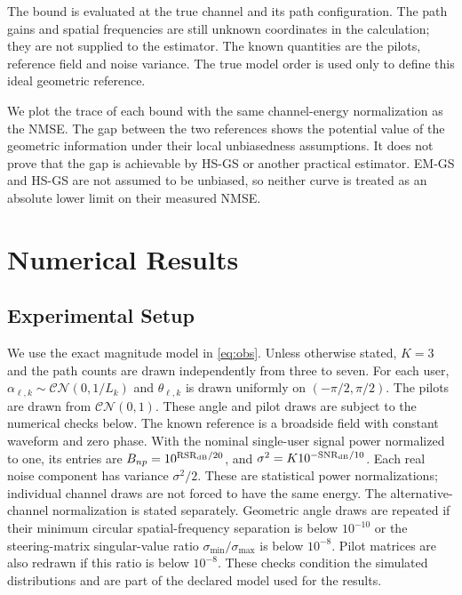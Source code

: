 \documentclass[journal]{IEEEtran}
\begin{document}
The bound is evaluated at the true channel and its path configuration.
The path gains and spatial frequencies are still unknown coordinates in
the calculation; they are not supplied to the estimator. The known
quantities are the pilots, reference field and noise variance. The true
model order is used only to define this ideal geometric reference.

We plot the trace of each bound with the same channel-energy normalization
as the NMSE. The gap between the two references shows the potential value
of the geometric information under their local unbiasedness assumptions.
It does not prove that the gap is achievable by HS-GS or another practical
estimator. EM-GS and HS-GS are not assumed to be unbiased, so neither curve
is treated as an absolute lower limit on their measured NMSE.

\section{Numerical Results}
\label{sec:results}

\subsection{Experimental Setup}

We use the exact magnitude model in \eqref{eq:obs}. Unless otherwise
stated, $K=3$ and the path counts are drawn independently from three to
seven. For each user, $\alpha_{\ell,k}\sim\mathcal{CN}(0,1/L_k)$ and
$\theta_{\ell,k}$ is drawn uniformly on $(-\pi/2,\pi/2)$. The pilots
are drawn from $\mathcal{CN}(0,1)$. These angle and pilot draws are subject
to the numerical checks below. The known reference is a
broadside field with constant waveform and zero phase. With the nominal
single-user signal power normalized to one, its entries are
$B_{np}=10^{\mathrm{RSR}_{\rm dB}/20}$, and
$\sigma^2=K10^{-\mathrm{SNR}_{\rm dB}/10}$.
Each real noise component has variance $\sigma^2/2$. These are statistical
power normalizations; individual channel draws are not forced to have the
same energy. The alternative-channel normalization is stated separately.
Geometric angle draws are repeated if their minimum circular
spatial-frequency separation is below $10^{-10}$ or the steering-matrix
singular-value ratio $\sigma_{\min}/\sigma_{\max}$ is below $10^{-8}$.
Pilot matrices are also redrawn if this ratio is below $10^{-8}$.
These checks condition the simulated distributions and are part of the
declared model used for the results.
\end{document}
